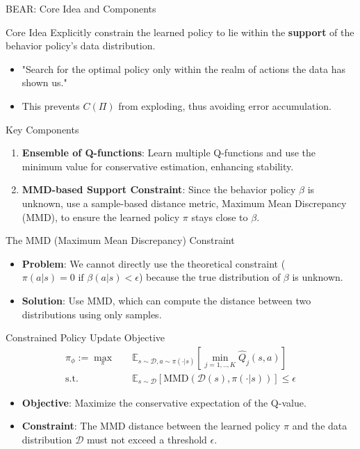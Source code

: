 \documentclass[11pt]{beamer}
\newcommand{\mbb}[1]{\mathbb{#1}}
\newcommand{\mc}[1]{\mathcal{#1}}
\newcommand{\tb}[1]{\textbf{#1}}
\begin{document}
\begin{frame}{BEAR: Core Idea and Components}
    \begin{block}{Core Idea}
        Explicitly constrain the learned policy to lie within the \tb{support} of the behavior policy's data distribution.
        \begin{itemize}
            \item "Search for the optimal policy only within the realm of actions the data has shown us."
            \item This prevents $C(\Pi)$ from exploding, thus avoiding error accumulation.
        \end{itemize}
    \end{block}

    \begin{block}{Key Components}
        \begin{enumerate}
            \item \tb{Ensemble of Q-functions}: Learn multiple Q-functions and use the minimum value for conservative estimation, enhancing stability.
            \item \tb{MMD-based Support Constraint}: Since the behavior policy $\beta$ is unknown, use a sample-based distance metric, Maximum Mean Discrepancy (MMD), to ensure the learned policy $\pi$ stays close to $\beta$.
        \end{enumerate}
    \end{block}
\end{frame}

\begin{frame}{The MMD (Maximum Mean Discrepancy) Constraint}
    \begin{itemize}
        \item \tb{Problem}: We cannot directly use the theoretical constraint ($\pi(a|s)=0 \text{ if } \beta(a|s)<\epsilon$) because the true distribution of $\beta$ is unknown.
        \item \tb{Solution}: Use MMD, which can compute the distance between two distributions using only samples.
    \end{itemize}
    
    \begin{block}{Constrained Policy Update Objective}
    \begin{align*}
    \pi_\phi := \max_{\pi} \quad & \mbb{E}_{s \sim \mc{D}, a \sim \pi(\cdot|s)} \left[ \min_{j=1,..,K} \hat{Q}_j(s,a) \right] \\
    \text{s.t.} \quad & \mbb{E}_{s \sim \mc{D}} \left[ \text{MMD}(\mc{D}(s), \pi(\cdot|s)) \right] \leq \epsilon
    \end{align*}
    \end{block}

    \begin{itemize}
        \item \tb{Objective}: Maximize the conservative expectation of the Q-value.
        \item \tb{Constraint}: The MMD distance between the learned policy $\pi$ and the data distribution $\mc{D}$ must not exceed a threshold $\epsilon$.
    \end{itemize}
\end{frame}
\end{document}
